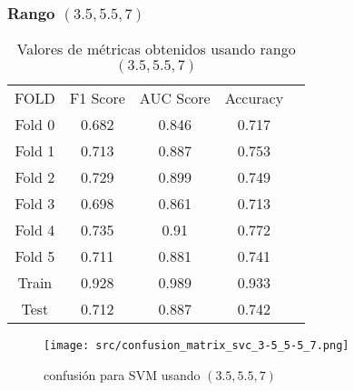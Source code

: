 \subsubsection*{Rango $(3.5,5.5,7)$}
\begin{table}[H]
	\centering
	\begin{tabular}{|c|c|c|c|c}
		\cline{1-4}
		FOLD   & F1 Score & AUC Score & Accuracy \\ \cline{1-4}
		Fold 0 & 0.682    & 0.846     & 0.717    \\ \cline{1-4}
		Fold 1 & 0.713    & 0.887     & 0.753    \\ \cline{1-4}
		Fold 2 & 0.729    & 0.899     & 0.749    \\ \cline{1-4}
		Fold 3 & 0.698    & 0.861     & 0.713    \\ \cline{1-4}
		Fold 4 & 0.735    & 0.91      & 0.772    \\ \cline{1-4}
		Fold 5 & 0.711    & 0.881     & 0.741    \\ \cline{1-4}
		Train  & 0.928    & 0.989     & 0.933    \\ \cline{1-4}
		Test   & 0.712    & 0.887     & 0.742    \\ \cline{1-4}
	\end{tabular}
	\caption{Valores de métricas obtenidos usando rango $(3.5,5.5,7)$}
\end{table}
\begin{figure}[H]
	\centering
	\texttt{[image: src/confusion\_matrix\_svc\_3-5\_5-5\_7.png]}
	\caption{ confusión para SVM usando $(3.5,5.5,7)$}
	\label{fig:confusion_matrix_svm1}
\end{figure}

